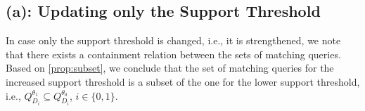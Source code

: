 

\subsection*{(a): Updating only the Support Threshold}

In case only the support threshold is changed, i.e.,
it is strengthened, we note that there exists a
containment relation between the sets of matching
queries. Based on \autoref{prop:subset}, we conclude
that the set
of matching queries for the increased support
threshold is a
subset of the one for the lower support threshold, i.e.,
$Q_{D_i}^{\theta_1} \subseteq Q_{D_i}^{\theta_0}$, $i\in \{0,1\}$.


